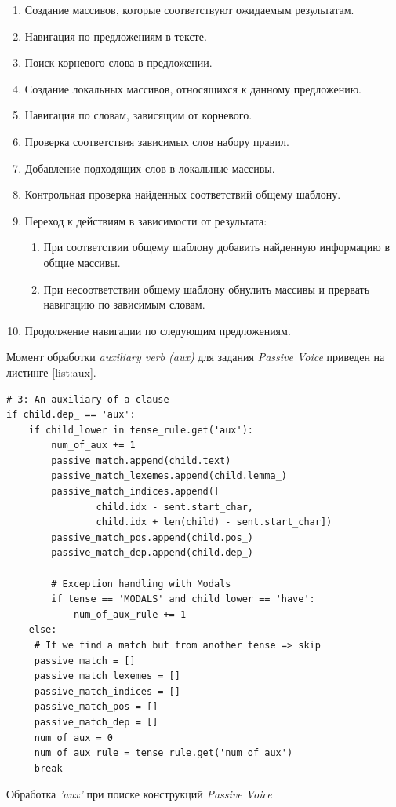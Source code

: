 \begin{enumerate}
  \item Создание массивов, которые соответствуют ожидаемым результатам.
  \item Навигация по предложениям в тексте.
  \item Поиск корневого слова в предложении.
  \item Создание локальных массивов, относящихся к данному предложению.
  \item Навигация по словам, зависящим от корневого.
  \item Проверка соответствия зависимых слов набору правил.
  \item Добавление подходящих слов в локальные массивы.
  \item Контрольная проверка найденных соответствий общему шаблону.
  \item Переход к действиям в зависимости от результата:
  \begin{enumerate}[label*=\arabic*.]
      \item При соответствии общему шаблону добавить найденную информацию в общие массивы.
      \item При несоответствии общему шаблону обнулить массивы и прервать навигацию по зависимым словам.
    \end{enumerate}
 \item Продолжение навигации по следующим предложениям.
\end{enumerate}

Момент обработки \emph{auxiliary verb (aux)} для задания \emph{Passive Voice} приведен на листинге \ref{list:aux}.

\begin{ListingEnv}[h]
\begin{lstlisting}
# 3: An auxiliary of a clause
if child.dep_ == 'aux':
    if child_lower in tense_rule.get('aux'):
        num_of_aux += 1
        passive_match.append(child.text)
        passive_match_lexemes.append(child.lemma_)
        passive_match_indices.append([
                child.idx - sent.start_char,
                child.idx + len(child) - sent.start_char])
        passive_match_pos.append(child.pos_)
        passive_match_dep.append(child.dep_)

        # Exception handling with Modals
        if tense == 'MODALS' and child_lower == 'have':
            num_of_aux_rule += 1
    else:
     # If we find a match but from another tense => skip
     passive_match = []
     passive_match_lexemes = []
     passive_match_indices = []
     passive_match_pos = []
     passive_match_dep = []
     num_of_aux = 0
     num_of_aux_rule = tense_rule.get('num_of_aux')
     break
\end{lstlisting}
\caption{Обработка \emph{'aux'} при поиске конструкций \emph{Passive Voice}}
\label{list:aux}
\end{ListingEnv}


